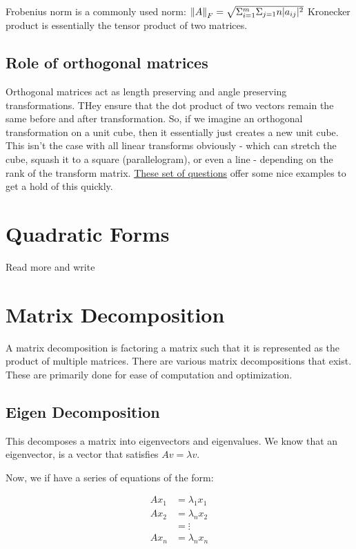 Frobenius norm is a commonly used norm: $\left\lVert A\right\rVert_F = \sqrt{\Sigma_{i=1}^{m}\Sigma_{j=1}{n}\lvert a_{ij}\rvert^2}$
Kronecker product is essentially the tensor product of two matrices.

\subsection{Role of orthogonal matrices}

Orthogonal matrices act as length preserving and angle preserving transformations. THey ensure that the dot product of two vectors remain the same before and after transformation. So, if we imagine an orthogonal transformation on a unit cube, then it essentially just creates a new unit cube. This isn't the case with all linear transforms obviously - which can stretch the cube, squash it to a square (parallelogram), or even a line - depending on the rank of the transform matrix. \href{http://www.math.lsa.umich.edu/~kesmith/OrthogonalTransformations2017.pdf}{These set of questions} offer some nice examples to get a hold of this quickly.

\section{Quadratic Forms}

Read more and write

\section{Matrix Decomposition}

A matrix decomposition is factoring a matrix such that it is represented as the product of multiple matrices. There are various matrix decompositions that exist. These are primarily done for ease of computation and optimization.

\subsection{Eigen Decomposition}

This decomposes a matrix into eigenvectors and eigenvalues. We know that an eigenvector, is a vector that satisfies $Av = \lambda v$. 

Now, we if have a series of equations of the form:

\begin{equation}
\begin{split}
    Ax_1 &= \lambda_1 x_1 \\
    Ax_2 &= \lambda_n x_2 \\
    &= \vdots \\
    Ax_n &= \lambda_n x_n \\
\end{split}
\end{equation}

